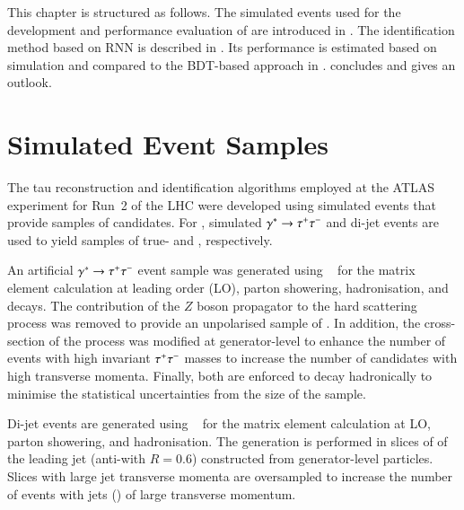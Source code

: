 This chapter is structured as follows. The simulated events used for
the development and performance evaluation of \tauid are introduced in
. The identification method based on RNN is
described in . Its performance is estimated based
on simulation and compared to the BDT-based approach in
.   concludes and
gives an outlook.


\section{Simulated Event Samples}%
\label{sec:tauid_mc}

The tau reconstruction and identification algorithms employed at the
ATLAS experiment for Run~2 of the LHC were developed using simulated
events that provide samples of \tauhadvis candidates. For \tauid,
simulated $\gamma^{*} \to \tau^{+} \tau^{-}$ and di-jet events are used to yield
samples of true- and \faketauhadvis, respectively.

An artificial $\gamma^{*} \to \tau^{+} \tau^{-}$ event sample was generated
using \PYTHIA[8.212]~\cite{Sjostrand:2014zea} for the matrix element
calculation at leading order (LO), parton showering, hadronisation,
and \taulepton decays. The contribution of the $Z$ boson propagator to
the hard scattering process was removed to provide an unpolarised
sample of \tauleptons. In addition, the cross-section of the process
was modified at generator-level to enhance the number of events with
high invariant $\tau^{+} \tau^{-}$ masses to increase the number of \tauhadvis
candidates with high transverse momenta. Finally, both \tauleptons are
enforced to decay hadronically to minimise the statistical
uncertainties from the size of the \truetauhadvis sample.

Di-jet events are generated using
\PYTHIA[8.186]~\cite{Sjostrand:2014zea} for the matrix element
calculation at LO, parton showering, and hadronisation. The generation
is performed in slices of \pT of the leading jet (anti-\kt with
$R = 0.6$) constructed from generator-level particles. Slices with
large jet transverse momenta are oversampled to increase the number of
events with jets (\faketauhadvis) of large transverse momentum.

